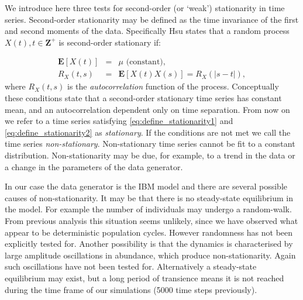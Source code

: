 We introduce here three tests for second-order (or `weak') stationarity in time series.  Second-order stationarity may be defined as the time invariance of the first and second moments of the data. Specifically Hsu \cite{hsu1997schaum} states that a random process $X(t), t \in \mathbf{Z}^+$ is second-order stationary if:

\begin{eqnarray}
	\mathbf{E}[X(t)] &=& \mu \text{ (constant),}\label{eq:define_stationarity1}\\
	R_X(t,s) &=& \mathbf{E}[X(t)X(s)] = R_X(|s-t|),\label{eq:define_stationarity2}
\end{eqnarray}
%
where $R_X(t,s)$ is the \emph{autocorrelation} function of the process. Conceptually these conditions state that a second-order stationary time series has constant mean, and an autocorrelation dependent only on time separation. From now on we refer to a time series satisfying \eqref{eq:define_stationarity1} and \eqref{eq:define_stationarity2} as \emph{stationary}. If the conditions are not met we call the time series \emph{non-stationary}. Non-stationary time series cannot be fit to a constant distribution. Non-stationarity may be due, for example, to a trend in the data or a change in the parameters of the data generator.

In our case the data generator is the IBM model and there are several possible causes of non-stationarity. It may be that there is no steady-state equilibrium in the model. For example the number of individuals may undergo a random-walk. From previous analysis this situation seems unlikely, since we have observed what appear to be deterministic population cycles. However randomness has not been explicitly tested for. Another possibility is that the dynamics is characterised by large amplitude oscillations in abundance, which produce non-stationarity. Again such oscillations have not been tested for. Alternatively a steady-state equilibrium may exist, but a long period of transience means it is not reached during the time frame of our simulations (5000 time steps previously).


